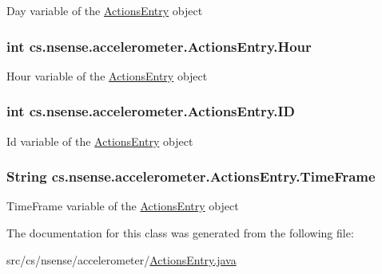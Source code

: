 Day variable of the \hyperlink{classcs_1_1nsense_1_1accelerometer_1_1_actions_entry}{Actions\-Entry} object \hypertarget{classcs_1_1nsense_1_1accelerometer_1_1_actions_entry_afdd99fa1e75722c47c82d413f87c1cad}{
\subsubsection[{Hour}]{\setlength{\rightskip}{0pt plus 5cm}int cs.\-nsense.\-accelerometer.\-Actions\-Entry.\-Hour\hspace{0.3cm}{\ttfamily [private]}}}\label{classcs_1_1nsense_1_1accelerometer_1_1_actions_entry_afdd99fa1e75722c47c82d413f87c1cad}
Hour variable of the \hyperlink{classcs_1_1nsense_1_1accelerometer_1_1_actions_entry}{Actions\-Entry} object \hypertarget{classcs_1_1nsense_1_1accelerometer_1_1_actions_entry_a8a7c463483983a47bf0ab7407baa9711}{
\subsubsection[{I\-D}]{\setlength{\rightskip}{0pt plus 5cm}int cs.\-nsense.\-accelerometer.\-Actions\-Entry.\-I\-D\hspace{0.3cm}{\ttfamily [private]}}}\label{classcs_1_1nsense_1_1accelerometer_1_1_actions_entry_a8a7c463483983a47bf0ab7407baa9711}
Id variable of the \hyperlink{classcs_1_1nsense_1_1accelerometer_1_1_actions_entry}{Actions\-Entry} object \hypertarget{classcs_1_1nsense_1_1accelerometer_1_1_actions_entry_af85930ad7355ea86af26adb607dd06d6}{
\subsubsection[{Time\-Frame}]{\setlength{\rightskip}{0pt plus 5cm}String cs.\-nsense.\-accelerometer.\-Actions\-Entry.\-Time\-Frame\hspace{0.3cm}{\ttfamily [private]}}}\label{classcs_1_1nsense_1_1accelerometer_1_1_actions_entry_af85930ad7355ea86af26adb607dd06d6}
Time\-Frame variable of the \hyperlink{classcs_1_1nsense_1_1accelerometer_1_1_actions_entry}{Actions\-Entry} object 

The documentation for this class was generated from the following file\-:\begin{DoxyCompactItemize}
\item 
src/cs/nsense/accelerometer/\hyperlink{_actions_entry_8java}{Actions\-Entry.\-java}\end{DoxyCompactItemize}
